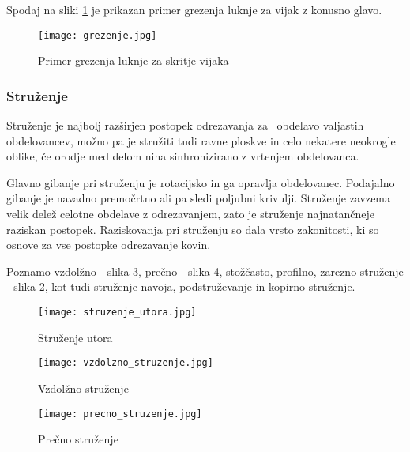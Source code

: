 Spodaj na sliki \ref{grezilo} je prikazan primer grezenja
luknje za vijak z konusno glavo.

\begin{figure}[H]
	\begin{center}
		\texttt{[image: grezenje.jpg]}
		\caption{Primer grezenja luknje za skritje vijaka
			\cite{sts_arhiv_grezenje}}
		\label{grezilo}
	\end{center}
\end{figure}

\subsubsection{Struženje}
Struženje je najbolj razširjen postopek odrezavanja za \
obdelavo valjastih obdelovancev, možno pa je stružiti tudi ravne ploskve
in celo nekatere neokrogle oblike, če orodje med delom niha sinhronizirano
z vrtenjem obdelovanca.

Glavno gibanje pri struženju je rotacijsko in ga opravlja
obdelovanec. Podajalno gibanje je navadno premočrtno ali pa
sledi poljubni krivulji. Struženje zavzema velik delež celotne
obdelave z odrezavanjem, zato je struženje najnatančneje
raziskan postopek. Raziskovanja pri struženju so dala vrsto
zakonitosti, ki so osnove za vse postopke odrezavanje kovin.

Poznamo vzdolžno - slika \ref{vzdolzno_struzenje},
prečno - slika \ref{precno_struzenje}, stožčasto, profilno,
zarezno struženje - slika \ref{struzenje_utora}, kot tudi struženje navoja, podstruževanje in kopirno struženje.

\begin{multicols}{3}
	\begin{figure}[H]
		\texttt{[image: struzenje\_utora.jpg]}
		\caption{Struženje utora
			\cite{sts_arhiv_struzenje}}
		\label{struzenje_utora}
	\end{figure}

	\columnbreak

	\begin{figure}[H]
		\texttt{[image: vzdolzno\_struzenje.jpg]}
		\caption{Vzdolžno struženje
			\cite{sts_arhiv_struzenje}}
		\label{vzdolzno_struzenje}
	\end{figure}

	\columnbreak

	\begin{figure}[H]
		\texttt{[image: precno\_struzenje.jpg]}
		\caption{Prečno struženje
			\cite{sts_arhiv_struzenje}}
		\label{precno_struzenje}
	\end{figure}
\end{multicols}
